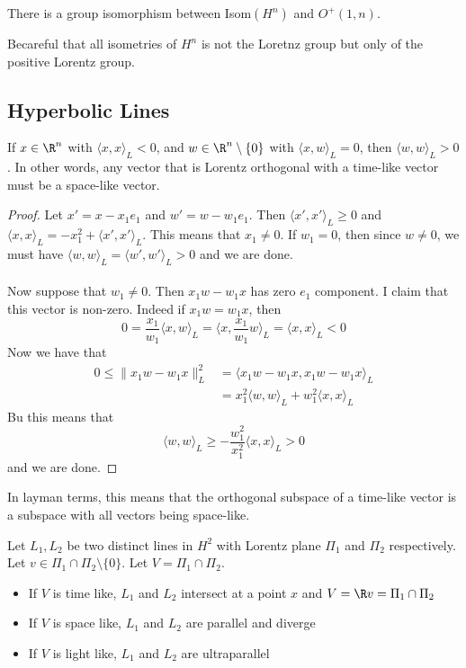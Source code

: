 \documentclass[a4paper]{article}
\begin{document}
\begin{crl}{}{} There is a group isomorphism between Isom$(H^n)$ and $O^+(1,n)$. 
\end{crl}

Becareful that all isometries of $H^n$ is not the Loretnz group but only of the positive Lorentz group. 

\subsection{Hyperbolic Lines}
\begin{lmm}{}{} If $x\in\R^n$ with $\langle x,x\rangle_L<0$, and $w\in\R^n\setminus\{0\}$ with $\langle x,w\rangle_L=0$, then $\langle w,w\rangle_L>0$. In other words, any vector that is Lorentz orthogonal with a time-like vector must be a space-like vector. \tcbline
\begin{proof}
Let $x'=x-x_1e_1$ and $w'=w-w_1e_1$. Then $\langle x',x'\rangle_L\geq 0$ and $\langle x,x\rangle_L=-x_1^2+\langle x',x'\rangle_L$. This means that $x_1\neq 0$. If $w_1=0$, then since $w\neq 0$, we must have $\langle w,w\rangle_L=\langle w',w'\rangle_L>0$ and we are done. \\~\\
Now suppose that $w_1\neq 0$. Then $x_1w-w_1x$ has zero $e_1$ component. I claim that this vector is non-zero. Indeed if $x_1w=w_1x$, then $$0=\frac{x_1}{w_1}\langle x,w\rangle_L=\langle x,\frac{x_1}{w_1}w\rangle_L=\langle x,x\rangle_L<0$$ Now we have that 
\begin{align*}
0\leq\|x_1w-w_1x\|_L^2&=\langle x_1w-w_1x,x_1w-w_1x\rangle_L\\
&=x_1^2\langle w,w\rangle_L+w_1^2\langle x,x\rangle_L
\end{align*}
Bu this means that $$\langle w,w\rangle_L\geq-\frac{w_1^2}{x_1^2}\langle x,x\rangle_L>0$$ and we are done. 
\end{proof}
\end{lmm}

In layman terms, this means that the orthogonal subspace of a time-like vector is a subspace with all vectors being space-like. 

\begin{defn}{}{} Let $L_1,L_2$ be two distinct lines in $H^2$ with Lorentz plane $\Pi_1$ and $\Pi_2$ respectively. Let $v\in\Pi_1\cap\Pi_2\setminus\{0\}$. Let $V=\Pi_1\cap\Pi_2$. 
\begin{itemize}
\item If $V$ is time like, $L_1$ and $L_2$ intersect at a point $x$ and $V=\R v=\Pi_1\cap\Pi_2$
\item If $V$ is space like, $L_1$ and $L_2$ are parallel and diverge
\item If $V$ is light like, $L_1$ and $L_2$ are ultraparallel
\end{itemize}
\end{defn}
\end{document}
